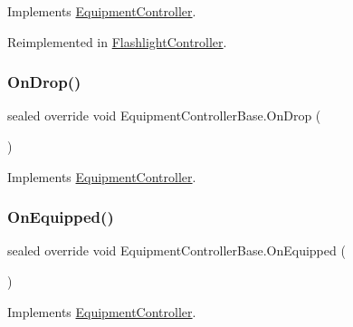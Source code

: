 Implements \mbox{\hyperlink{class_equipment_controller_a7eeee15beb95a3111424c83de2aa809b}{Equipment\+Controller}}.



Reimplemented in \mbox{\hyperlink{class_flashlight_controller_a3bc506518b599e1f8af7dfacb2180b35}{Flashlight\+Controller}}.

\mbox{\label{class_equipment_controller_base_a8d45225cd0b3e6e07dec3eda588b7df1}} 
\subsubsection{\texorpdfstring{On\+Drop()}{OnDrop()}}
{\footnotesize\ttfamily sealed override void Equipment\+Controller\+Base.\+On\+Drop (\begin{DoxyParamCaption}{ }\end{DoxyParamCaption})\hspace{0.3cm}{\ttfamily [virtual]}}



Implements \mbox{\hyperlink{class_equipment_controller_a27bdee4dd8690d8f72a7c7941104bb83}{Equipment\+Controller}}.

\mbox{\label{class_equipment_controller_base_a6518be3369d4118d4617c70c70fad38e}} 
\subsubsection{\texorpdfstring{On\+Equipped()}{OnEquipped()}}
{\footnotesize\ttfamily sealed override void Equipment\+Controller\+Base.\+On\+Equipped (\begin{DoxyParamCaption}{ }\end{DoxyParamCaption})\hspace{0.3cm}{\ttfamily [virtual]}}



Implements \mbox{\hyperlink{class_equipment_controller_acba8245d13e2339ef752de1945e21752}{Equipment\+Controller}}.

\mbox{\label{class_equipment_controller_base_a357889ef978abc906de8d5b36b26d613}} 
